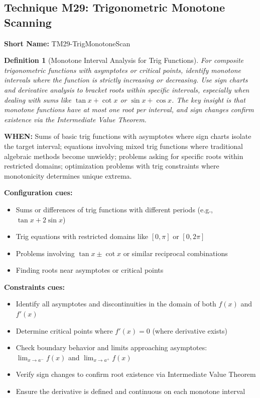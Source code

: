 \documentclass[12pt]{article}
\newtheorem{definition}{Definition}[section]
\begin{document}
\subsection{Technique M29: Trigonometric Monotone Scanning}
\textbf{Short Name:} TM29-TrigMonotoneScan

\begin{definition}[Monotone Interval Analysis for Trig Functions]
For composite trigonometric functions with asymptotes or critical points, identify monotone intervals where the function is strictly increasing or decreasing. Use sign charts and derivative analysis to bracket roots within specific intervals, especially when dealing with sums like $\tan x + \cot x$ or $\sin x + \cos x$. The key insight is that monotone functions have at most one root per interval, and sign changes confirm existence via the Intermediate Value Theorem.
\end{definition}

\textbf{WHEN:} Sums of basic trig functions with asymptotes where sign charts isolate the target interval; equations involving mixed trig functions where traditional algebraic methods become unwieldy; problems asking for specific roots within restricted domains; optimization problems with trig constraints where monotonicity determines unique extrema.

\textbf{Configuration cues:}
\begin{itemize}
    \item Sums or differences of trig functions with different periods (e.g., $\tan x + 2\sin x$)
    \item Trig equations with restricted domains like $[0, \pi]$ or $[0, 2\pi]$
    \item Problems involving $\tan x \pm \cot x$ or similar reciprocal combinations
    \item Finding roots near asymptotes or critical points
\end{itemize}

\textbf{Constraints cues:}
\begin{itemize}
    \item Identify all asymptotes and discontinuities in the domain of both $f(x)$ and $f'(x)$
    \item Determine critical points where $f'(x) = 0$ (where derivative exists)
    \item Check boundary behavior and limits approaching asymptotes: $\lim_{x \to a^-} f(x)$ and $\lim_{x \to a^+} f(x)$
    \item Verify sign changes to confirm root existence via Intermediate Value Theorem
    \item Ensure the derivative is defined and continuous on each monotone interval
\end{itemize}
\end{document}
